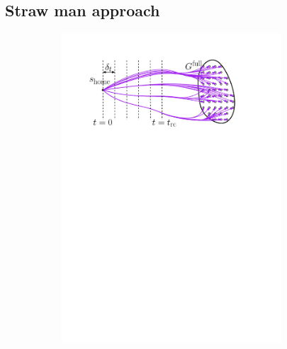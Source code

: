 \documentclass[conference]{IEEEtran}
\begin{document}
\subsection{Straw man approach}
\begin{figure}[t]
    \centering
    \hspace{3mm}
    \begin{subfigure}{.225\textwidth}
        \includegraphics[width=0.9\textwidth]{naive1}
        \caption{}
        \label{fig:naive1}
    \end{subfigure}
    \begin{subfigure}{0.225\textwidth}

\end{subfigure}
\end{figure}
\end{document}
